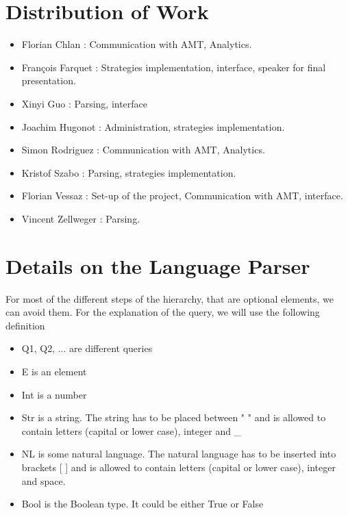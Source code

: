\documentclass{article}
\begin{document}
\appendix
\section{Distribution of Work}\label{distr}
\begin{itemize}
\item Florian Chlan : Communication with AMT, Analytics.
\item François Farquet : Strategies implementation, interface, speaker for final presentation.
\item Xinyi Guo : Parsing, interface
\item Joachim Hugonot : Administration, strategies implementation.
\item Simon Rodriguez : Communication with AMT, Analytics.
\item Kristof Szabo : Parsing, strategies implementation. 
\item Florian Vessaz : Set-up of the project, Communication with AMT, interface.
\item Vincent Zellweger : Parsing.
\end{itemize}

\section{Details on the Language Parser}\label{parse}

For most of the different steps of the hierarchy, that are optional elements, we can avoid them. %
For the explanation of the query, we will use the following definition
\begin{itemize}
\item Q1, Q2, ... are different queries
\item E is an element
\item Int is a number
\item Str is a string. The string has to be placed between " " and is allowed to contain letters (capital or lower case), integer and \_
\item NL is some natural language. The natural language has to be inserted into brackets [ ] and is allowed to contain letters (capital or lower case), integer and space.
\item Bool is the Boolean type. It could be either True or False
\end{itemize}
\end{document}
